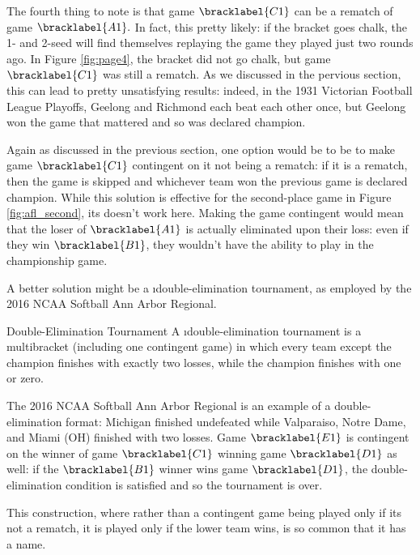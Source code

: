 {    The fourth thing to note is that game $\bracklabel{C1}$ can be a rematch of game $\bracklabel{A1}.$ In fact, this pretty likely: if the bracket goes chalk, the 1- and 2-seed will find themselves replaying the game they played just two rounds ago. In Figure \ref{fig:page4}, the bracket did not go chalk, but game $\bracklabel{C1}$ was still a rematch. As we discussed in the pervious section, this can lead to pretty unsatisfying results: indeed, in the 1931 Victorian Football League Playoffs, Geelong and Richmond each beat each other once, but Geelong won the game that mattered and so was declared champion. 
    
    Again as discussed in the previous section, one option would be to be to make game $\bracklabel{C1}$ contingent on it not being a rematch: if it is a rematch, then the game is skipped and whichever team won the previous game is declared champion. While this solution is effective for the second-place game in Figure \ref{fig:afl_second}, its doesn't work here. Making the game contingent would mean that the loser of $\bracklabel{A1}$ is actually eliminated upon their loss: even if they win $\bracklabel{B1}$, they wouldn't have the ability to play in the championship game.

    A better solution might be a \i{double-elimination tournament}, as employed by the 2016 NCAA Softball Ann Arbor Regional.


    \begin{definition}{Double-Elimination Tournament}{}
        A \i{double-elimination} tournament is a multibracket (including one contingent game) in which every team except the champion finishes with exactly two losses, while the champion finishes with one or zero. 
    \end{definition}

    The 2016 NCAA Softball Ann Arbor Regional is an example of a double-elimination format: Michigan finished undefeated while Valparaiso, Notre Dame, and Miami (OH) finished with two losses. Game $\bracklabel{E1}$ is contingent on the winner of game $\bracklabel{C1}$ winning game $\bracklabel{D1}$ as well: if the $\bracklabel{B1}$ winner wins game $\bracklabel{D1}$, the double-elimination condition is satisfied and so the tournament is over.

    This construction, where rather than a contingent game being played only if its not a rematch, it is played only if the lower team wins, is so common that it has a name.

}

